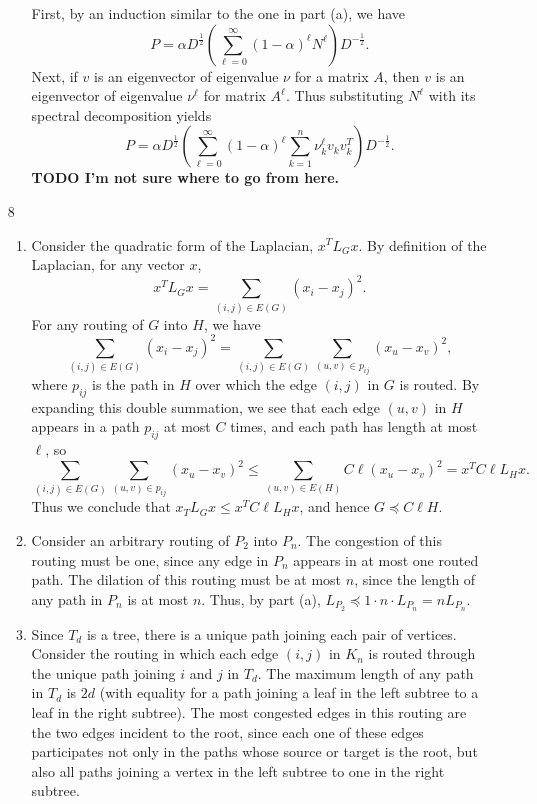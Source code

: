 \documentclass{article}
\newcommand{\todo}[1]{\textbf{TODO #1}}
\newcommand{\1}{\mathbf{1}}
\newcommand{\0}{\mathbf{0}}
\begin{document}
\begin{enumerate}
\begin{enumerate}
    First, by an induction similar to the one in part (a), we have
    \begin{equation*}
      P = \alpha D^{\frac{1}{2}} \left(\sum_{\ell = 0}^\infty (1 - \alpha)^\ell N^\ell\right) D^{-\frac{1}{2}}.
    \end{equation*}
    Next, if $v$ is an eigenvector of eigenvalue $\nu$ for a matrix $A$, then $v$ is an eigenvector of eigenvalue $\nu^\ell$ for matrix $A^\ell$.
    Thus substituting $N^\ell$ with its spectral decomposition yields
    \begin{equation*}
      P = \alpha D^{\frac{1}{2}} \left(\sum_{\ell = 0}^\infty (1 - \alpha)^\ell \sum_{k = 1}^n \nu_k^\ell v_k v_k^T \right) D^{-\frac{1}{2}}.
    \end{equation*}
    \todo{I'm not sure where to go from here.}
  \end{enumerate}
\item[8]
  \begin{enumerate}
  \item
    Consider the quadratic form of the Laplacian, $x^T L_G x$.
    By definition of the Laplacian, for any vector $x$,
    \begin{equation*}
      x^T L_G x = \sum_{(i, j) \in E(G)} (x_i - x_j)^2.
    \end{equation*}
    For any routing of $G$ into $H$, we have
    \begin{equation*}
      \sum_{(i, j) \in E(G)} (x_i - x_j)^2 = \sum_{(i, j) \in E(G)} \sum_{(u, v) \in p_{ij}} (x_u - x_v)^2,
    \end{equation*}
    where $p_{ij}$ is the path in $H$ over which the edge $(i, j)$ in $G$ is routed.
    By expanding this double summation, we see that each edge $(u, v)$ in $H$ appears in a path $p_{ij}$ at most $C$ times, and each path has length at most $\ell$, so
    \begin{equation*}
      \sum_{(i, j) \in E(G)} \sum_{(u, v) \in p_{ij}} (x_u - x_v)^2 \leq \sum_{(u, v) \in E(H)} C \ell (x_u - x_v)^2 = x^T C \ell L_H x.
    \end{equation*}
    Thus we conclude that $x_T L_G x \leq x^T C \ell L_H x$, and hence $G \preceq C \ell H$.
  \item
    Consider an arbitrary routing of $P_2$ into $P_n$.
    The congestion of this routing must be one, since any edge in $P_n$ appears in at most one routed path.
    The dilation of this routing must be at most $n$, since the length of any path in $P_n$ is at most $n$.
    Thus, by part (a), $L_{P_2} \preceq 1 \cdot n \cdot L_{P_n} = n L_{P_n}$.
  \item
    Since $T_d$ is a tree, there is a unique path joining each pair of vertices.
    Consider the routing in which each edge $(i, j)$ in $K_n$ is routed through the unique path joining $i$ and $j$ in $T_d$.
    The maximum length of any path in $T_d$ is $2d$ (with equality for a path joining a leaf in the left subtree to a leaf in the right subtree).
    The most congested edges in this routing are the two edges incident to the root, since each one of these edges participates not only in the paths whose source or target is the root, but also all paths joining a vertex in the left subtree to one in the right subtree.


\end{enumerate}
\end{enumerate}
\end{document}
